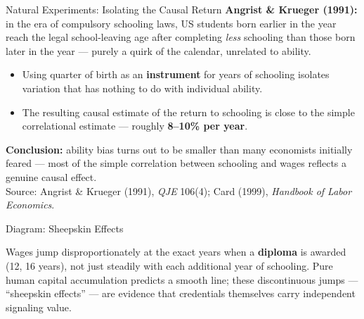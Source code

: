 \documentclass[11pt,aspectratio=169]{beamer}
\newcommand{\srcnote}[1]{{\footnotesize\color{wugray}Source: #1}}
\begin{document}
\begin{frame}{Natural Experiments: Isolating the Causal Return}
  \textbf{Angrist \& Krueger (1991):} in the era of compulsory schooling laws, US students born earlier in the year reach the legal school-leaving age after completing \emph{less} schooling than those born later in the year --- purely a quirk of the calendar, unrelated to ability.
  \begin{itemize}
    \item Using quarter of birth as an \textbf{instrument} for years of schooling isolates variation that has nothing to do with individual ability.
    \item The resulting causal estimate of the return to schooling is close to the simple correlational estimate --- roughly \textbf{8--10\% per year}.
  \end{itemize}
  \small \textbf{Conclusion:} ability bias turns out to be smaller than many economists initially feared --- most of the simple correlation between schooling and wages reflects a genuine causal effect.\\
  \srcnote{Angrist \& Krueger (1991), \emph{QJE} 106(4); Card (1999), \emph{Handbook of Labor Economics}.}
\end{frame}

\begin{frame}{Diagram: Sheepskin Effects}
  \begin{center}
  \end{center}
  \footnotesize Wages jump disproportionately at the exact years when a \textbf{diploma} is awarded (12, 16 years), not just steadily with each additional year of schooling. Pure human capital accumulation predicts a smooth line; these discontinuous jumps --- ``sheepskin effects'' --- are evidence that credentials themselves carry independent signaling value.
\end{frame}
\end{document}
